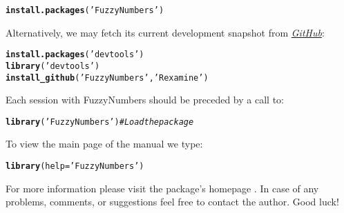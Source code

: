 \documentclass[11pt]{article}\usepackage[]{graphicx}\usepackage[]{color}
\makeatletter
\newcommand{\hlstr}[1]{\textcolor[rgb]{0.192,0.494,0.8}{#1}}%
\newcommand{\hlcom}[1]{\textcolor[rgb]{0.678,0.584,0.686}{\textit{#1}}}%
\newcommand{\hlstd}[1]{\textcolor[rgb]{0.345,0.345,0.345}{#1}}%
\newcommand{\hlkwc}[1]{\textcolor[rgb]{0.333,0.667,0.333}{#1}}%
\newcommand{\hlkwd}[1]{\textcolor[rgb]{0.737,0.353,0.396}{\textbf{#1}}}%
\newenvironment{kframe}{%
 \def\at@end@of@kframe{}%
 \ifinner\ifhmode%
  \def\at@end@of@kframe{\end{minipage}}%
  \begin{minipage}{\columnwidth}%
 \fi\fi%
 \def\FrameCommand##1{\hskip\@totalleftmargin \hskip-\fboxsep
 \colorbox{shadecolor}{##1}\hskip-\fboxsep
     \hskip-\linewidth \hskip-\@totalleftmargin \hskip\columnwidth}%
 \MakeFramed {\advance\hsize-\width
   \@totalleftmargin\z@ \linewidth\hsize
   \@setminipage}}%
 {\par\unskip\endMakeFramed%
 \at@end@of@kframe}
\newenvironment{knitrout}{}{} %
\newcommand{\package}[1]{\textsf{#1}\xspace}
\makeatother
\begin{document}
\begin{knitrout}\small
{}\color{fgcolor}\begin{kframe}
\begin{alltt}
\hlkwd{install.packages}\hlstd{(}\hlstr{'FuzzyNumbers'}\hlstd{)}
\end{alltt}
\end{kframe}
\end{knitrout}

\noindent
Alternatively, we may fetch its current development snapshot
from \href{https://github.com/Rexamine/FuzzyNumbers}{\textit{GitHub}}:

\begin{knitrout}\small
{}\color{fgcolor}\begin{kframe}
\begin{alltt}
\hlkwd{install.packages}\hlstd{(}\hlstr{'devtools'}\hlstd{)}
\hlkwd{library}\hlstd{(}\hlstr{'devtools'}\hlstd{)}
\hlkwd{install_github}\hlstd{(}\hlstr{'FuzzyNumbers'}\hlstd{,} \hlstr{'Rexamine'}\hlstd{)}
\end{alltt}
\end{kframe}
\end{knitrout}


\bigskip
Each session with \package{FuzzyNumbers} should be preceded by
a call to:

\begin{knitrout}\small
{}\color{fgcolor}\begin{kframe}
\begin{alltt}
\hlkwd{library}\hlstd{(}\hlstr{'FuzzyNumbers'}\hlstd{)} \hlcom{# Load the package}
\end{alltt}
\end{kframe}
\end{knitrout}

\bigskip
To view the main page of the manual we type:

\begin{knitrout}\small
{}\color{fgcolor}\begin{kframe}
\begin{alltt}
\hlkwd{library}\hlstd{(}\hlkwc{help}\hlstd{=}\hlstr{'FuzzyNumbers'}\hlstd{)}
\end{alltt}
\end{kframe}
\end{knitrout}

\noindent
For more information please visit the package's homepage
\cite{Gagolewski:fuzzynumberspackage}. In case of any problems, comments,
or suggestions feel free to contact the author. Good luck!
\end{document}
